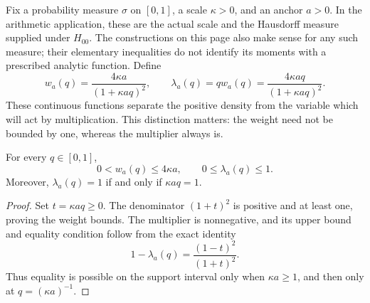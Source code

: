 \label{front:normalized}

Fix a probability measure $\sigma$ on $[0,1]$, a scale $\kappa>0$, and an
anchor $a>0$. In the arithmetic application, these are the actual scale and
the Hausdorff measure supplied under $H_{00}$. The constructions on this
page also make sense for any such measure; their elementary inequalities
do not identify its moments with a prescribed analytic function. Define
\begin{equation}
 w_a(q)=\frac{4\kappa a}{(1+\kappa aq)^2},\qquad
 \lambda_a(q)=q w_a(q)=\frac{4\kappa aq}{(1+\kappa aq)^2}.
\end{equation}
These continuous functions separate the positive density from the variable
which will act by multiplication. This distinction matters: the weight
need not be bounded by one, whereas the multiplier always is.

\begin{proposition}\label{front:kernel-range}
For every $q\in[0,1]$,
\begin{equation}
 0<w_a(q)\leq 4\kappa a,\qquad 0\leq\lambda_a(q)\leq1.
\end{equation}
Moreover, $\lambda_a(q)=1$ if and only if $\kappa aq=1$.
\end{proposition}
\begin{proof}
Set $t=\kappa aq\geq0$. The denominator $(1+t)^2$ is positive and
at least one, proving the weight bounds. The multiplier is nonnegative,
and its upper bound and equality condition follow from the exact identity
\begin{equation}
 1-\lambda_a(q)=\frac{(1-t)^2}{(1+t)^2}.
\end{equation}
Thus equality is possible on the support interval only when
$\kappa a\geq1$, and then only at $q=(\kappa a)^{-1}$.
\end{proof}

